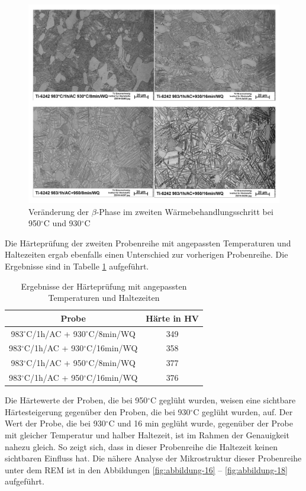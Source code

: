 \begin{figure}
	\centering
	\includegraphics[width=0.9\linewidth]{./Bilder/Abbildung 15.png}
	\caption[Abbildung 15]{Veränderung der $\beta$-Phase im zweiten Wärmebehandlungsschritt bei 950$^\circ$C und 930$^\circ$C}
	\label{fig:abbildung-15}
\end{figure}

Die Härteprüfung der zweiten Probenreihe mit angepassten Temperaturen und Haltezeiten ergab ebenfalls einen Unterschied zur vorherigen Probenreihe. Die Ergebnisse sind in Tabelle \ref{Tabelle 7} aufgeführt.

\begin{table}
	\centering
	\begin{tabular}{|c|c|}
		\hline 
		Probe & Härte in HV \\ 
		\hline 
		983$^\circ$C/1h/AC + 930$^\circ$C/8min/WQ & 349 \\ 
		\hline 
		983$^\circ$C/1h/AC + 930$^\circ$C/16min/WQ & 358 \\ 
		\hline 
		983$^\circ$C/1h/AC + 950$^\circ$C/8min/WQ & 377 \\ 
		\hline 
		983$^\circ$C/1h/AC + 950$^\circ$C/16min/WQ & 376 \\ 
		\hline 
	\end{tabular} 
	\caption{Ergebnisse der Härteprüfung mit angepassten Temperaturen und Haltezeiten}
	\label{Tabelle 7}
\end{table}

Die Härtewerte der Proben, die bei 950$^\circ$C geglüht wurden, weisen eine sichtbare Härtesteigerung gegenüber den Proben, die bei 930$^\circ$C geglüht wurden, auf. Der Wert der Probe, die bei 930$^\circ$C und 16 min geglüht wurde, gegenüber der Probe mit gleicher Temperatur und halber Haltezeit, ist im Rahmen der Genauigkeit nahezu gleich. So zeigt sich, dass in dieser Probenreihe die Haltezeit keinen sichtbaren Einfluss hat. Die nähere Analyse der Mikrostruktur dieser Probenreihe unter dem REM ist in den Abbildungen \ref{fig:abbildung-16} -- \ref{fig:abbildung-18} aufgeführt.

